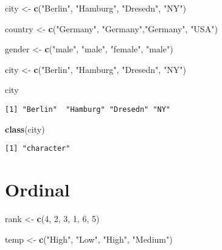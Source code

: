\documentclass[]{book}
\newenvironment{Shaded}{\begin{snugshade}}{\end{snugshade}}
\newcommand{\KeywordTok}[1]{\textcolor[rgb]{0.13,0.29,0.53}{\textbf{#1}}}
\newcommand{\DecValTok}[1]{\textcolor[rgb]{0.00,0.00,0.81}{#1}}
\newcommand{\StringTok}[1]{\textcolor[rgb]{0.31,0.60,0.02}{#1}}
\newcommand{\NormalTok}[1]{#1}
\theoremstyle{definition}
\theoremstyle{definition}
\theoremstyle{definition}
\theoremstyle{remark}
\begin{document}
\begin{Shaded}
\begin{Highlighting}[]
\NormalTok{city <-}\StringTok{ }\KeywordTok{c}\NormalTok{(}\StringTok{"Berlin"}\NormalTok{, }\StringTok{"Hamburg"}\NormalTok{, }\StringTok{"Dresedn"}\NormalTok{, }\StringTok{"NY"}\NormalTok{)}

\NormalTok{country <-}\StringTok{ }\KeywordTok{c}\NormalTok{(}\StringTok{"Germany"}\NormalTok{, }\StringTok{"Germany"}\NormalTok{,}\StringTok{"Germany"}\NormalTok{, }\StringTok{"USA"}\NormalTok{)}

\NormalTok{gender <-}\StringTok{ }\KeywordTok{c}\NormalTok{(}\StringTok{"male"}\NormalTok{, }\StringTok{"male"}\NormalTok{, }\StringTok{"female"}\NormalTok{, }\StringTok{"male"}\NormalTok{)}
\end{Highlighting}
\end{Shaded}

\begin{Shaded}
\begin{Highlighting}[]
\NormalTok{city <-}\StringTok{ }\KeywordTok{c}\NormalTok{(}\StringTok{"Berlin"}\NormalTok{, }\StringTok{"Hamburg"}\NormalTok{, }\StringTok{"Dresedn"}\NormalTok{, }\StringTok{"NY"}\NormalTok{)}

\NormalTok{city }
\end{Highlighting}
\end{Shaded}

\begin{verbatim}
[1] "Berlin"  "Hamburg" "Dresedn" "NY"     
\end{verbatim}

\begin{Shaded}
\begin{Highlighting}[]
\KeywordTok{class}\NormalTok{(city)}
\end{Highlighting}
\end{Shaded}

\begin{verbatim}
[1] "character"
\end{verbatim}

\section{Ordinal}\label{ordinal}

\begin{Shaded}
\begin{Highlighting}[]
\NormalTok{rank <-}\StringTok{ }\KeywordTok{c}\NormalTok{(}\DecValTok{4}\NormalTok{, }\DecValTok{2}\NormalTok{, }\DecValTok{3}\NormalTok{, }\DecValTok{1}\NormalTok{, }\DecValTok{6}\NormalTok{, }\DecValTok{5}\NormalTok{)}

\NormalTok{temp <-}\StringTok{ }\KeywordTok{c}\NormalTok{(}\StringTok{"High"}\NormalTok{, }\StringTok{"Low"}\NormalTok{, }\StringTok{"High"}\NormalTok{, }\StringTok{"Medium"}\NormalTok{)}
\end{Highlighting}
\end{Shaded}
\end{document}

